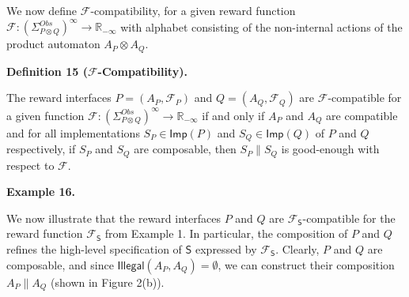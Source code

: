  
 
We now define $\mathcal{F}$-compatibility, for a given reward function $\mathcal{F}:(\Sigma_{P\otimes Q}^{Obs})^{\infty}\to\mathbb{R}_{-\infty}$ with alphabet consisting of the non-internal actions of the product automaton $A_{P}\otimes A_{Q}$.\par
 
 
 
\par\medskip\noindent\textbf{Definition 15 ($\mathcal{F}$-Compatibility).}\par
 
 
The reward interfaces $P=(A_{P},\mathcal{F}_{P})$ and $Q=(A_{Q},\mathcal{F}_{Q})$ are $\mathcal{F}$-compatible for a given function $\mathcal{F}:(\Sigma_{P\otimes Q}^{Obs})^{\infty}\to\mathbb{R}_{-\infty}$ if and only if $A_{P}$ and $A_{Q}$ are compatible and for all implementations $S_{P}\in\mathsf{Imp}(P)$ and $S_{Q}\in\mathsf{Imp}(Q)$ of $P$ and $Q$ respectively, if $S_{P}$ and $S_{Q}$ are composable, then $S_{P}\parallel S_{Q}$ is good-enough with respect to $\mathcal{F}$.\par
 
 
 
 
\par\medskip\noindent\textbf{Example 16.}\par
 
 
We now illustrate that the reward interfaces $P$ and $Q$ are $\mathcal{F}_{\mathsf{S}}$-compatible for the reward function $\mathcal{F}_{\mathsf{S}}$ from Example 1. In particular, the composition of $P$ and $Q$ refines the high-level specification of $\mathsf{S}$ expressed by $\mathcal{F}_{\mathsf{S}}$. Clearly, $P$ and $Q$ are composable, and since $\mathsf{Illegal}(A_{P},A_{Q})=\emptyset$, we can construct their composition $A_{P}\parallel A_{Q}$ (shown in Figure 2(b)).\par
 
 
 
